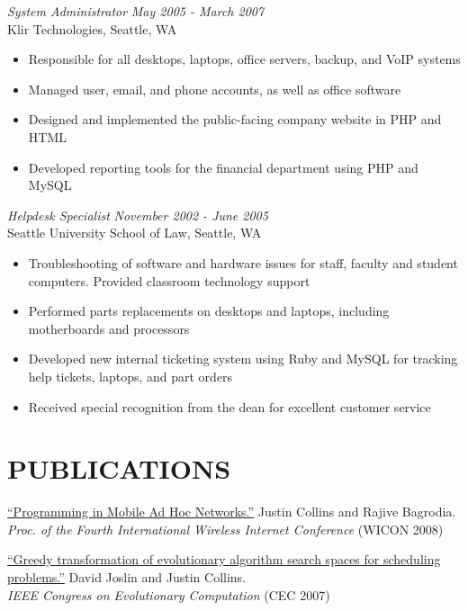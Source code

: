 \documentclass[margin]{res}
\begin{document}
\begin{resume}
		{\sl System Administrator} \hfill \textit{May 2005 - March 2007} \\
                Klir Technologies, Seattle, WA 
		\begin{itemize}  \itemsep -2pt %
		\item Responsible for all desktops, laptops, office servers, backup, and VoIP systems
		\item Managed user, email, and phone accounts, as well as office software
		\item Designed and implemented the public-facing company website in PHP and HTML
		\item Developed reporting tools for the financial department using PHP and MySQL
                \end{itemize}

		{\sl Helpdesk Specialist} \hfill \textit{November 2002 - June 2005} \\
                Seattle University School of Law, Seattle, WA 
		\begin{itemize}  \itemsep -2pt %
		\item Troubleshooting of software and hardware issues for staff, faculty and student computers. Provided classroom technology support
		\item Performed parts replacements on desktops and laptops, including motherboards and processors
		\item Developed new internal ticketing system using Ruby and MySQL for tracking help tickets, laptops, and part orders
		\item Received special recognition from the dean for excellent customer service
                \end{itemize}

\section{PUBLICATIONS}
		\href{http://cs.ucla.edu/~collins/documents/Justin_Collins-WICON08.pdf}{``Programming in Mobile Ad Hoc Networks.''} Justin Collins and Rajive Bagrodia. \\
		{\it Proc. of the Fourth International Wireless Internet Conference} (WICON 2008)

		\href{http://cs.ucla.edu/~collins/documents/Joslin_Collins-Greedy_Transformations_of_Search_Spaces.pdf}{``Greedy transformation of evolutionary algorithm search spaces for scheduling problems.''} David Joslin and Justin Collins.\\
		{\it IEEE Congress on Evolutionary Computation} (CEC 2007)


\end{resume}
\end{document}
